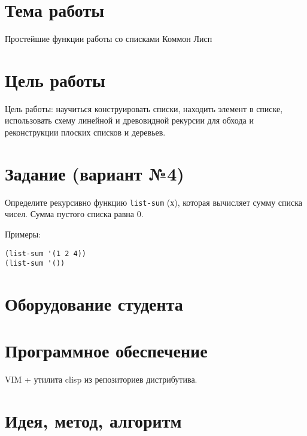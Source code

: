 \documentclass[12pt]{article}
\begin{document}

\section{Тема работы}
Простейшие функции работы со списками Коммон Лисп

\section{Цель работы}
Цель работы: научиться конструировать списки, находить элемент в списке,
использовать схему линейной и древовидной рекурсии для обхода и реконструкции
плоских списков и деревьев.

\section{Задание (вариант №4)}
\noindent
Определите рекурсивно функцию {\tt list-sum} (х), которая вычисляет сумму
списка чисел.
Сумма пустого списка равна 0.

Примеры:

\begin{lstlisting}
(list-sum '(1 2 4))
(list-sum '())
\end{lstlisting}

\section{Оборудование студента}
\mypc

\section{Программное обеспечение}
VIM + утилита clisp из репозиториев дистрибутива.

\section{Идея, метод, алгоритм}

\end{document}
